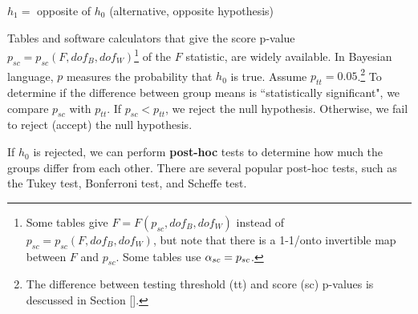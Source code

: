 $h_1=$ opposite of $h_0$  (alternative, opposite hypothesis)

Tables 
and 
software calculators that give 
the score p-value $p_{sc}=p_{sc}(F, dof_B, dof_W)$\footnote{Some tables give
$F=F(p_{sc}, dof_B, dof_W)$
instead of $p_{sc}=p_{sc}(F, dof_B, dof_W)$,
but note that there is a 1-1/onto 
invertible map between $F$ and $p_{sc}$.
Some tables use $\alpha_{sc}=p_{sc}$.
}
of the $F$ statistic,
are widely available. 
In Bayesian language,
$p$
measures
the probability
that $h_0$ is true.
Assume $p_{tt}=0.05$.\footnote{
The difference between 
testing threshold (tt)
and score (sc) p-values
is descussed in Section [].}
To determine if the difference between group means is ``statistically significant", 
we compare $p_{sc}$ with $p_{tt}$. 
If $p_{sc}<p_{tt}$, we reject the null hypothesis.
Otherwise, we fail to reject (accept) the null hypothesis.

If $h_0$ is rejected,  we can  perform {\bf post-hoc} tests to determine how much 
the groups differ from each other.
There are several  popular post-hoc tests,
such as 
the
Tukey test,
Bonferroni test, and 
Scheffe test.